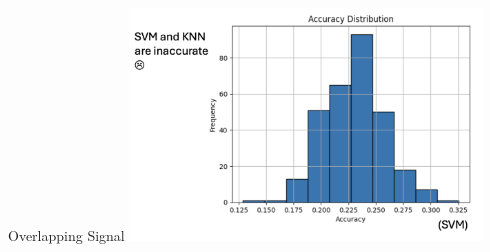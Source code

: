 \begin{frame}{Overlapping Signal}
    \centering
    \includegraphics[height=0.7\textheight,width=0.7\textwidth,keepaspectratio]{images/dylan-3-6.png}
\end{frame}





